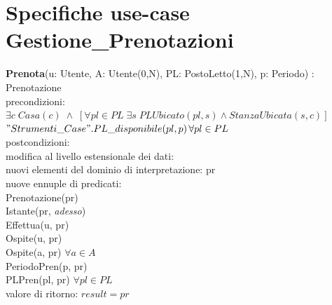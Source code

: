 \documentclass[a4paper,12pt]{report}
\begin{document}
      \section*{Specifiche use-case Gestione\_Prenotazioni}
        \textbf{Prenota}(u: Utente, A: Utente(0,N), PL: PostoLetto(1,N), p: Periodo) : Prenotazione \\
        \hspace*{1cm} precondizioni: \\
        \hspace*{2cm}$\exists c \; Casa(c) \; \wedge \; [\forall pl \in PL \; \exists s \; PLUbicato(pl, s) \wedge StanzaUbicata(s, c)]$ \\
        \hspace*{2cm}$"Strumenti\_Case".PL\_disponibile(pl, p) \, \forall pl \in PL$ \\
        \hspace*{1cm} postcondizioni: \\
        \hspace*{2cm} modifica al livello estensionale dei dati: \\
        \hspace*{3cm} nuovi elementi del dominio di interpretazione: pr \\
        \hspace*{3cm} nuove ennuple di predicati: \\
        \hspace*{4cm} Prenotazione(pr) \\
        \hspace*{4cm} Istante(pr, \textit{adesso}) \\
        \hspace*{4cm} Effettua(u, pr) \\
        \hspace*{4cm} Ospite(u, pr) \\
        \hspace*{4cm} Ospite(a, pr) $\forall a \in A$ \\
        \hspace*{4cm} PeriodoPren(p, pr) \\
        \hspace*{4cm} PLPren(pl, pr) $\forall pl \in PL$ \\
        \hspace*{2cm} valore di ritorno: $result = pr$ \\ \\
\end{document}
